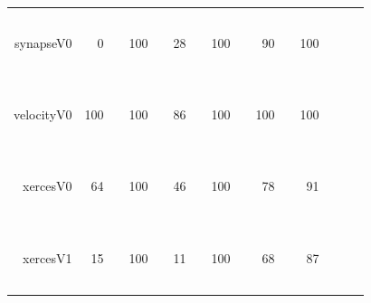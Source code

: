 \documentclass{sig-alternative}
\newcommand{\crule}[3][darkgray]{\textcolor{#1}{\rule{#2}{#3}}}
\newcommand{\rone}{\crule{1mm}{1.95mm}}
\newcommand{\rtwo}{\crule{1mm}{1.95mm}\hspace{0.3pt}\crule{1mm}{1.95mm}}
\newcommand{\rthree}{\crule{1mm}{1.95mm}\hspace{0.3pt}\crule{1mm}{1.95mm}\hspace{0.3pt}\crule{1mm}{1.95mm}}
\newcommand{\rfour}{\crule{1mm}{1.95mm}\hspace{0.3pt}\crule{1mm}{1.95mm}\hspace{0.3pt}\crule{1mm}{1.95mm}\hspace{0.3pt}\crule{1mm}{1.95mm}}
\begin{document}
\begin{figure}
\begin{minipage}{0.81\linewidth}
\begin{tabular}{r@{~}|r@{~}l@{~}|r@{~}l@{~}|r@{~}l|r@{~}@{~}l|r@{~}l@{~}|r@{~}l@{~}|r@{~}l}
synapseV0 & 0 &         & 100 & {\rfour} & 28 & {\rone} & 100 & {\rfour} & 90 & {\rfour} & 100 & {\rfour}\\
velocityV0 & 100 & {\rfour} & 100 & {\rfour} & 86 &         & 100 & {\rfour} & 100 & {\rfour} & 100 & {\rfour}\\
xercesV0 & 64 & {\rone} & 100 & {\rfour} & 46 &         & 100 & {\rfour} & 78 & {\rtwo} & 91 & {\rfour}\\
xercesV1 & 15 &         & 100 & {\rfour} & 11 &         & 100 & {\rfour} & 68 & {\rthree} & 87 & {\rfour}\\
\end{tabular}
\end{minipage}\begin{minipage}{.15\linewidth}
\begin{tabular}{|p{\linewidth}|}\hline


\end{tabular}
\end{minipage}
\end{figure}
\end{document}
